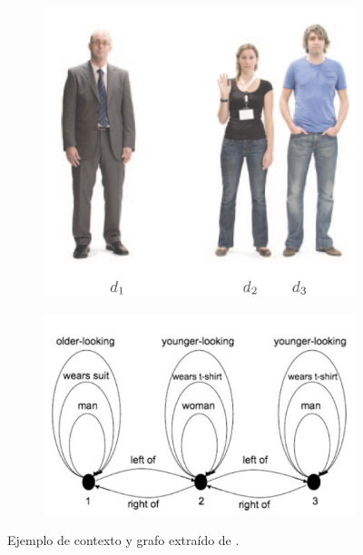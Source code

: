 \begin{center}
\begin{figure}[ht]
\begin{subfigure}{.5\textwidth}\centering
\includegraphics[width=\textwidth]{images/contexto-survey.png}\\[0pt]
\label{figura-survey}
\end{subfigure}
%
\begin{subfigure}{.5\textwidth}\centering
\includegraphics[width=\textwidth]{images/grafo-survey.png}\\[0pt]
\label{grafo-survey}
\end{subfigure}
\caption{Ejemplo de contexto y grafo extra\'ido de \protect\cite{survey}.}\label{fig2-8}
\end{figure}
\end{center}


